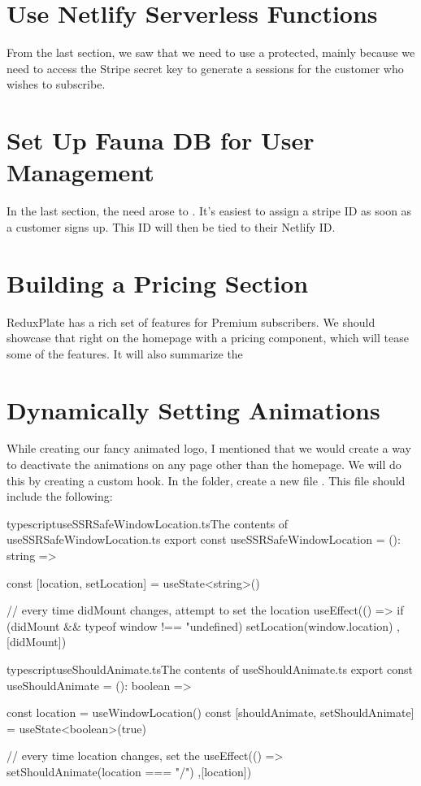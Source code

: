 \documentclass[paper=6in:9in,pagesize=pdftex,headinclude=on,footinclude=on,12pt,twoside]{scrbook}
\begin{document}
\section{Use Netlify Serverless Functions}

From the last section, we saw that we need to use a protected, mainly because we need to access the Stripe secret key to generate a sessions for the customer who wishes to subscribe.

\section{Set Up Fauna DB for User Management}

In the last section, the need arose to . It's easiest to assign a stripe ID as soon as a customer signs up. This ID will then be tied to their Netlify ID.

\section{Building a Pricing Section}

ReduxPlate has a rich set of features for Premium subscribers. We should showcase that right on the homepage with a pricing component, which will tease some of the features. It will also summarize the 

\section{Dynamically Setting Animations}

While creating our fancy animated logo, I mentioned that we would create a way to deactivate the animations on any page other than the homepage. We will do this by creating a custom hook. In the  folder, create a new file . This file should include the following:

\begin{codeInput}{typescript}{useSSRSafeWindowLocation.ts}{The contents of useSSRSafeWindowLocation.ts}
export const useSSRSafeWindowLocation = (): string => {
  const [location, setLocation] = useState<string>()

  // every time didMount changes, attempt to set the location
  useEffect(() => {
    if (didMount && typeof window !== "undefined) {
      setLocation(window.location)
    }
  },[didMount])
}
\end{codeInput}

\begin{codeInput}{typescript}{useShouldAnimate.ts}{The contents of useShouldAnimate.ts}
export const useShouldAnimate = (): boolean => {
  const location = useWindowLocation()
  const [shouldAnimate, setShouldAnimate] = useState<boolean>(true)

  // every time location changes, set the
  useEffect(() => {
    setShouldAnimate(location === "/") 
  },[location])
}
\end{codeInput}
\end{document}
